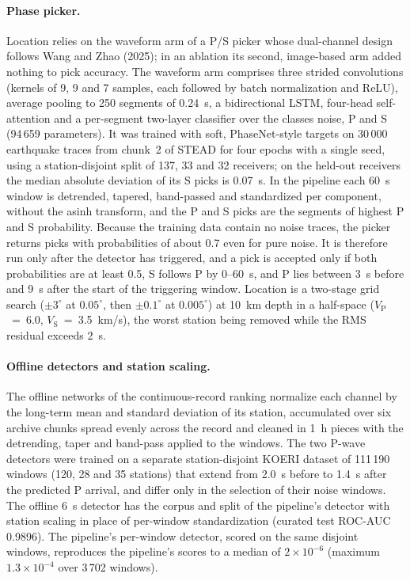 \documentclass[11pt,a4paper]{article}
\newcommand{\VP}{$V_\mathrm{P}$}
\newcommand{\VS}{$V_\mathrm{S}$}
\begin{document}
\paragraph{Phase picker.} Location relies on the waveform arm of a P/S picker whose
dual-channel design follows Wang and Zhao (2025); in an ablation its second,
image-based arm added nothing to pick accuracy. The waveform arm comprises three
strided convolutions (kernels of 9, 9 and 7 samples, each followed by batch
normalization and ReLU), average pooling to 250 segments of 0.24~s, a bidirectional
LSTM, four-head self-attention and a per-segment two-layer classifier over the classes
noise, P and S (94\,659 parameters). It was trained with soft, PhaseNet-style targets
on 30\,000 earthquake traces from chunk~2 of STEAD for four epochs with a single seed,
using a station-disjoint split of 137, 33 and 32 receivers; on the held-out receivers
the median absolute deviation of its S picks is 0.07~s. In the pipeline each 60~s
window is detrended, tapered, band-passed and standardized per component, without
the asinh transform, and the P and S picks are the segments of highest P and S
probability. Because the training data contain no noise traces, the picker returns
picks with probabilities of about 0.7 even for pure noise. It is therefore run only
after the detector has triggered, and a pick is accepted only if both probabilities
are at least 0.5, S follows P by 0--60~s, and P lies between 3~s before and 9~s after
the start of the triggering window. Location is a two-stage grid search ($\pm 3^\circ$
at $0.05^\circ$, then $\pm 0.1^\circ$ at $0.005^\circ$) at 10~km depth in a half-space
(\VP{}~=~6.0, \VS{}~=~3.5~km/s), the worst station being removed while the RMS residual
exceeds 2~s.

\paragraph{Offline detectors and station scaling.} The offline networks of the
continuous-record ranking normalize each channel by the long-term mean and standard
deviation of its station, accumulated over six archive chunks spread evenly across the
record and cleaned in 1~h pieces with the detrending, taper and band-pass applied to
the windows. The two P-wave detectors were trained on a separate station-disjoint
KOERI dataset of 111\,190 windows (120, 28 and 35 stations) that extend from 2.0~s
before to 1.4~s after the predicted P arrival, and differ only in the selection of
their noise windows. The offline 6~s detector has the corpus and split of the
pipeline's detector with station scaling in place of per-window standardization
(curated test ROC-AUC 0.9896). The pipeline's per-window detector, scored on the same
disjoint windows, reproduces the pipeline's scores to a median of $2\times10^{-6}$
(maximum $1.3\times10^{-4}$ over 3\,702 windows).
\end{document}
